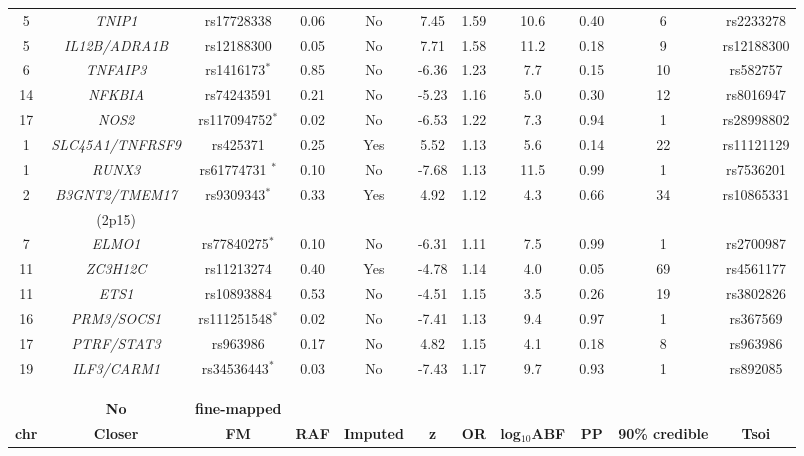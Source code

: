 \begin{landscape}
\begin{center}
\begin{longtable}[ht]{c c c c c c c c c c c}
5	& \textit{TNIP1}&		     rs17728338            &		0.06 &	No	& 7.45  &1.59 &		10.6 &		0.40 &		6	 &	rs2233278 \\
5	& \textit{IL12B/ADRA1B}& rs12188300            &		0.05 &	No	& 7.71  &1.58 &		11.2 &		0.18 &		9	 &	rs12188300 \\
6	& \textit{TNFAIP3}&		   rs1416173$^{\ast}$    &		0.85 &	No	& -6.36 &1.23 &		7.7  &		0.15 &		10 &		rs582757 \\
14	& \textit{NFKBIA}&		 rs74243591            &		0.21 &	No	& -5.23 &1.16 &		5.0  &		0.30 &		12 &		rs8016947 \\
17	& \textit{NOS2}&		   rs117094752$^{\ast}$  &		0.02 &	No  & -6.53 &1.22 &		7.3  &		0.94 &		1  &		rs28998802 \\
1	& \textit{SLC45A1/TNFRSF9}&		rs425371         &		0.25 &  Yes  & 5.52  &1.13 &		5.6  &		0.14 &		22 &		rs11121129 \\
1	& \textit{RUNX3}&		     rs61774731 $^{\ast}$  &		0.10 &	No	& -7.68 &1.13 &		11.5 &		0.99 &		1  &		rs7536201 \\
2	& \textit{B3GNT2/TMEM17}&rs9309343$^{\ast}$    &		0.33 &	Yes	& 4.92  &1.12 &		4.3  &		0.66 &		34 &		rs10865331 \\
  &  (2p15)               &                      &         &      &       &     &        &         &       &\\
7	& \textit{ELMO1}        &rs77840275$^{\ast}$   &		0.10 &	No	&-6.31  &1.11 &		7.5  &		0.99 &		1  &		rs2700987 \\
11	& \textit{ZC3H12C}    &rs11213274            &		0.40 &	Yes	& -4.78 &1.14 &		4.0  &		0.05 &		69 &		rs4561177 \\
11 & \textit{ETS1}	      & rs10893884	         &    0.53 &  No  & -4.51 &1.15 &  3.5	 &    0.26 &    19 &    rs3802826	 \\
16	& \textit{PRM3/SOCS1}& rs111251548$^{\ast}$  &		0.02 &	No	& -7.41 &1.13 &		9.4  &		0.97 &		1  &		rs367569 \\
17	& \textit{PTRF/STAT3}& rs963986              &		0.17 &	No	& 4.82  &1.15 &		4.1  &		0.18 &		8  &		rs963986 \\
19	& \textit{ILF3/CARM1}& rs34536443$^{\ast}$   &		0.03 &	No	& -7.43 &1.17 &		9.7  &		0.93 &		1  &		rs892085 \\
&&&&&&&&&&\\
&&&&&&&&&&\\
&&&&&&&&&&\\
&\textbf{No} & \textbf{fine-mapped}&&&&&&&&\\
\midrule
\midrule
\textbf{chr} & \textbf{Closer} & \textbf{FM} & \textbf{RAF} & \textbf{Imputed}& \textbf{z} &\textbf{OR} & \textbf{log$_{10}$ABF} & \textbf{PP} & \textbf{90\% credible} &\textbf{Tsoi} \\

\end{longtable}
\end{center}
\end{landscape}
